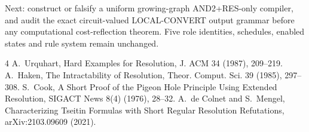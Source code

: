\documentclass[11pt]{article}
\begin{document}
Next: construct or falsify a uniform growing-graph AND2+RES-only compiler, and audit the exact circuit-valued LOCAL-CONVERT output grammar before any computational cost-reflection theorem. Five role identities, schedules, enabled states and rule system remain unchanged.
\begin{thebibliography}{4}
 A.~Urquhart, Hard Examples for Resolution, J. ACM 34 (1987), 209--219.
 A.~Haken, The Intractability of Resolution, Theor. Comput. Sci. 39 (1985), 297--308.
 S.~Cook, A Short Proof of the Pigeon Hole Principle Using Extended Resolution, SIGACT News 8(4) (1976), 28--32.
 A.~de Colnet and S.~Mengel, Characterizing Tseitin Formulas with Short Regular Resolution Refutations, arXiv:2103.09609 (2021).
\end{thebibliography}
\end{document}

